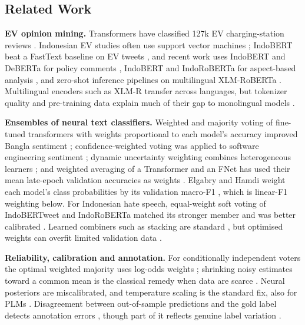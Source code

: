 \documentclass[conference,a4paper]{IEEEtran}
\begin{document}
\subsection{Related Work}

\textbf{EV opinion mining.} Transformers have classified 127k EV charging-station reviews \cite{ha2021}. Indonesian EV studies often use support vector machines \cite{alhari2022, ekatama2023, saraswati2025}; IndoBERT beat a FastText baseline on EV tweets \cite{wijaya2024}, and recent work uses IndoBERT and DeBERTa for policy comments \cite{nugroho2025}, IndoBERT and IndoRoBERTa for aspect-based analysis \cite{canavara2025}, and zero-shot inference pipelines on multilingual XLM-RoBERTa \cite{nugroho2024zero}. Multilingual encoders such as XLM-R \cite{conneau2020} transfer across languages, but tokenizer quality and pre-training data explain much of their gap to monolingual models \cite{rust2021}.

\textbf{Ensembles of neural text classifiers.} Weighted and majority voting of fine-tuned transformers with weights proportional to each model's accuracy improved Bangla sentiment \cite{seth2023}; confidence-weighted voting was applied to software engineering sentiment \cite{batra2021}; dynamic uncertainty weighting combines heterogeneous learners \cite{yang2025}; and weighted averaging of a Transformer and an FNet has used their mean late-epoch validation accuracies as weights \cite{wu2026}. Elgabry and Hamdi weight each model's class probabilities by its validation macro-F1 \cite{elgabry2026}, which is linear-F1 weighting below. For Indonesian hate speech, equal-weight soft voting of IndoBERTweet and IndoRoBERTa matched its stronger member and was better calibrated \cite{alkaff2026}. Learned combiners such as stacking are standard \cite{ganaie2022}, but optimised weights can overfit limited validation data \cite{purucker2023}.

\textbf{Reliability, calibration and annotation.} For conditionally independent voters the optimal weighted majority uses log-odds weights \cite{kuncheva2014}; shrinking noisy estimates toward a common mean is the classical remedy when data are scarce \cite{efron2021}. Neural posteriors are miscalibrated, and temperature scaling is the standard fix, also for PLMs \cite{guo2017, xiao2022}. Disagreement between out-of-sample predictions and the gold label detects annotation errors \cite{klie2023, northcutt2021}, though part of it reflects genuine label variation \cite{plank2022}.
\end{document}
